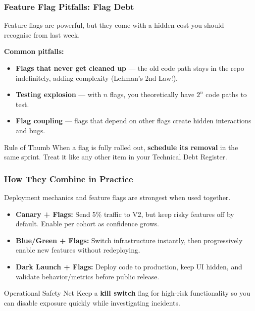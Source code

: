 \documentclass[xcolor=table]{beamer}
\begin{document}
\begin{frame}
    \frametitle{Feature Flag Pitfalls: Flag Debt}
    \small
    Feature flags are powerful, but they come with a hidden cost you should recognise from last week.


    \vspace{0.2cm}
    \textbf{Common pitfalls:}
    \begin{itemize}
        \item \textbf{Flags that never get cleaned up} — the old code path stays in the repo indefinitely, adding complexity (Lehman's 2nd Law!).
        \item \textbf{Testing explosion} — with $n$ flags, you theoretically have $2^n$ code paths to test.
        \item \textbf{Flag coupling} — flags that depend on other flags create hidden interactions and bugs.
    \end{itemize}

    \vspace{0.1cm}
    \begin{block}{Rule of Thumb}
        When a flag is fully rolled out, \textbf{schedule its removal} in the same sprint. Treat it like any other item in your Technical Debt Register.
    \end{block}
\end{frame}

\begin{frame}
    \frametitle{How They Combine in Practice}
    \small
    Deployment mechanics and feature flags are strongest when used together.

    \vspace{0.2cm}
    \begin{itemize}
        \item \textbf{Canary + Flags:} Send 5\% traffic to V2, but keep risky features off by default. Enable per cohort as confidence grows.
        \item \textbf{Blue/Green + Flags:} Switch infrastructure instantly, then progressively enable new features without redeploying.
        \item \textbf{Dark Launch + Flags:} Deploy code to production, keep UI hidden, and validate behavior/metrics before public release.
    \end{itemize}

    \vspace{0.2cm}
    \begin{block}{Operational Safety Net}
        Keep a \textbf{kill switch} flag for high-risk functionality so you can disable exposure quickly while investigating incidents.
    \end{block}
\end{frame}
\end{document}
